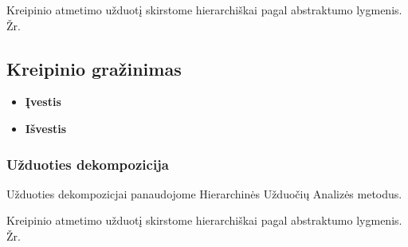 	
	Kreipinio atmetimo užduotį skirstome hierarchiškai pagal abstraktumo lygmenis. Žr. 
	
	\subsection {Kreipinio gražinimas}	
	
		\begin{itemize}
			\item \textbf{Įvestis}
			\item \textbf{Išvestis} 
		\end{itemize}

	\subsubsection {Užduoties dekompozicija}

	Užduoties dekompozicjai panaudojome Hierarchinės Užduočių Analizės metodus.
 		

	Kreipinio atmetimo užduotį skirstome hierarchiškai pagal abstraktumo lygmenis. Žr. 
